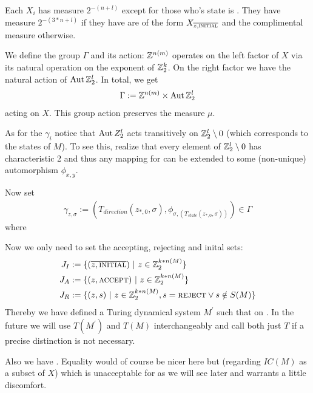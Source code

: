 \remark Each $X_i$ has measure $2^{-(n+l)}$ except for those who's state is \INI. They have measure $2^{-(3*n+l)}$ if they have are of the form $X_{\overline{z,\text{\scshape{initial}}}}$ and the complimental measure otherwise.

We define the group $\Gamma$ and its action:
$\mathbb{Z}^{n(m)}$ operates on the left factor of $X$ via its natural operation on the exponent of $\mathbb{Z}_2^k$.
On the right factor we have the natural action of $\operatorname{Aut} \mathbb{Z}_2^l$.
In total, we get
\begin{align*}
	\Gamma := \mathbb{Z}^{n(m)} \times \operatorname{Aut} \mathbb{Z}_2^l
\end{align*}
acting on $X$.
This group action preserves the measure $\mu$.

As for the $\gamma_i$ notice that
$\operatorname{Aut} Z_2^l$ acts transitively on $\mathbb{Z}_2^l \setminus 0$ (which corresponds to the states of $M$).
To see this, realize that every element of $\mathbb{Z}_2^l \setminus 0$ has characteristic 2 and thus any mapping  for  can be extended to some (non-unique) automorphism $\phi_{x,y}$.

Now set
\begin{align*}
	\gamma_{z,\sigma} := (T_{direction}(z_{*,0},\sigma) , \phi_{\sigma,(T_{state}(z_{*,0},\sigma))}) \in \Gamma
\end{align*}
where 

Now we only need to set the accepting, rejecting and inital sets:
\begin{align*}
	J_I & := \{(\overline{z,\text{\scshape{initial}}}) ~\vert~ z \in \mathbb{Z}_2^{k * n(M)} \} \\
	J_A & := \{(z,\text{\scshape{accept}}) ~\vert~ z \in \mathbb{Z}_2^{k * n(M)} \} \\
	J_R & := \{(z,s) ~\vert~ z \in \mathbb{Z}_2^{k * n(M)} , s = \text{\scshape{reject}} \vee s \notin S(M) \} \\
\end{align*}
Thereby we have defined a Turing dynamical system $M^\prime$ such that  on .
In the future we will use $T(M^\prime)$ and $T(M)$ interchangeably and call both just $T$ if a precise distinction is not necessary.

Also we have .
Equality would of course be nicer here but (regarding $IC(M)$ as a subset of $X$)  which is unacceptable for  as we will see later and warrants a little discomfort.
